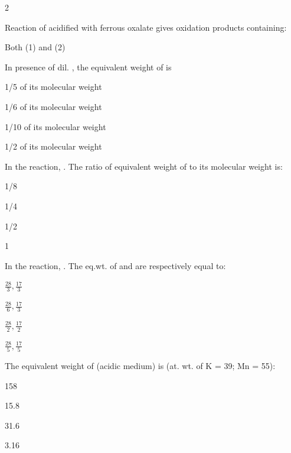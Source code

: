 \documentclass[10pt,a4paper]{article}
\begin{document}
\begin{multicols}{2}
\begin{questions}[start=119]
\item Reaction of acidified  with ferrous oxalate gives oxidation products containing:
\begin{options}
  \item {}
  \item {}
  \item Both (1) and (2)
  \item {}
\end{options}

\item In presence of dil. , the equivalent weight of  is
\begin{options}
  \item 1/5 of its molecular weight
  \item 1/6 of its molecular weight
  \item 1/10 of its molecular weight
  \item 1/2 of its molecular weight
\end{options}

\item In the reaction, . The ratio of equivalent weight of  to its molecular weight is:
\begin{options}
  \item 1/8
  \item 1/4
  \item 1/2
  \item 1
\end{options}

\item In the reaction, . The eq.wt. of  and  are respectively equal to:
\begin{options}
  \item $\frac{28}{3}, \frac{17}{3}$
  \item $\frac{28}{6}, \frac{17}{3}$
  \item $\frac{28}{2}, \frac{17}{2}$
  \item $\frac{28}{5}, \frac{17}{5}$
\end{options}

\item The equivalent weight of  (acidic medium) is (at. wt. of K = 39; Mn = 55):
\begin{options}
  \item 158
  \item 15.8
  \item 31.6
  \item 3.16
\end{options}


\end{questions}
\end{multicols}
\end{document}

